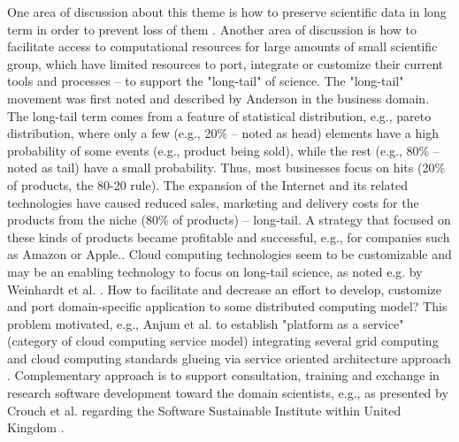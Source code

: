 One area of discussion about this theme is how to preserve scientific data in long term in order to prevent loss of them \cite{Vines2014,P.BryanHeidorn2008}. Another area of discussion is how to facilitate access to computational resources for large amounts of small scientific group, which have limited resources to port, integrate or customize their current tools and processes -- to support the "long-tail" of science. The "long-tail" movement was first noted and described by Anderson \cite{Anderson2006} in the business domain. %
The long-tail term comes from a feature of statistical distribution, e.g., pareto distribution, where only a few (e.g., 20\% -- noted as head) elements have a high probability of some events (e.g., product being sold), while the rest (e.g., 80\% -- noted as tail) have a small probability. Thus, most businesses focus on hits (20\% of products, the 80-20 rule). The expansion of the Internet and its related technologies have caused reduced sales, marketing and delivery costs for the products from the niche (80\% of products) -- long-tail. A strategy that focused on these kinds of products became profitable and successful, e.g., for companies such as Amazon or Apple.\cite{Anderson2006}. 
Cloud computing technologies seem to be customizable and may be an enabling technology to focus on long-tail science, 
as noted e.g. by Weinhardt et al. \cite{Weinhardt2009}. 
How to facilitate and decrease an effort to develop, customize and port domain-specific application to some distributed computing model? This problem motivated, 
e.g., Anjum et al. to establish "platform as a service" (category of cloud computing service model) integrating several grid computing and cloud computing standards glueing via service oriented architecture approach \cite{Anjum2012}. 
Complementary approach is to support consultation, training and exchange in research software development toward the domain scientists, e.g., as presented by Crouch et al. regarding the Software Sustainable Institute within United Kingdom \cite{Crouch2013}.
